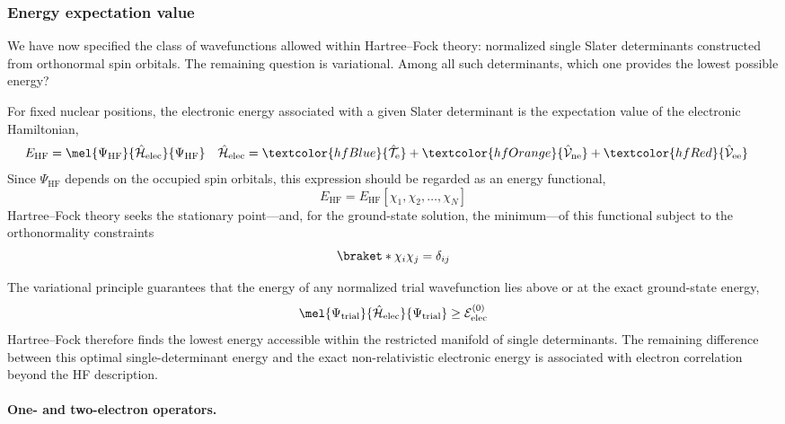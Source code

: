 \documentclass[11pt,a4paper,titlepage]{article}
\numberwithin{equation}{section}
\newcommand{\EHF}{E_\text{HF}}
\newcommand{\chH}{\Hat{\mathcal{H}}}
\newcommand{\chT}{\Hat{\mathcal{T}}}
\newcommand{\chV}{\Hat{\mathcal{V}}}
\newcommand{\cE}{\mathcal{E}}
\newcommand{\red}[1]{\textcolor{hfRed}{#1}}
\newcommand{\orange}[1]{\textcolor{hfOrange}{#1}}
\newcommand{\blue}[1]{\textcolor{hfBlue}{#1}}
\begin{document}
\subsubsection{Energy expectation value}

We have now specified the class of wavefunctions allowed within
Hartree--Fock theory: normalized single Slater determinants constructed from
orthonormal spin orbitals. The remaining question is variational. Among all
such determinants, which one provides the lowest possible energy?

For fixed nuclear positions, the electronic energy associated with a given
Slater determinant is the expectation value of the electronic Hamiltonian,
\begin{align}
  \EHF
  &=
  \mel{\Psi_\text{HF}}{\chH_\text{elec}}{\Psi_\text{HF}}
  &
  \chH_\text{elec}
  &=
  \blue{\chT_\text{e}}
  +
  \orange{\chV_\text{ne}}
  +
  \red{\chV_\text{ee}}
  \label{eq:hf-expectation-value}
\end{align}
Since $\Psi_\text{HF}$ depends on the occupied spin orbitals, this expression
should be regarded as an energy functional,
\begin{equation}
  \EHF
  =
  \EHF[\chi_1,\chi_2,\ldots,\chi_N]
\end{equation}
Hartree--Fock theory seeks the stationary point---and, for the ground-state
solution, the minimum---of this functional subject to the orthonormality
constraints
\begin{equation}
  \braket*{\chi_i}{\chi_j}=\delta_{ij}
\end{equation}

The variational principle guarantees that the energy of any normalized trial
wavefunction lies above or at the exact ground-state energy,
\begin{equation}
  \mel{\Psi_\text{trial}}{\chH_\text{elec}}{\Psi_\text{trial}}
  \geq
  \cE_\text{elec}^{(0)}
\end{equation}
Hartree--Fock therefore finds the lowest energy accessible within the
restricted manifold of single determinants. The remaining difference between
this optimal single-determinant energy and the exact non-relativistic
electronic energy is associated with electron correlation beyond the HF
description.

\paragraph{One- and two-electron operators.}
\end{document}
